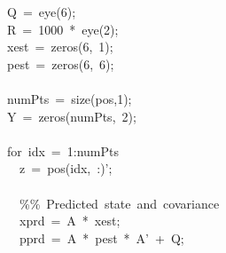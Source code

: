 \documentclass{article}\usepackage[]{graphicx}\usepackage[]{color}
\makeatletter
\newcommand{\hlnum}[1]{\textcolor[rgb]{0.863,0.196,0.184}{#1}}%
\newcommand{\hlstr}[1]{\textcolor[rgb]{0.863,0.196,0.184}{#1}}%
\newcommand{\hlopt}[1]{\textcolor[rgb]{0.576,0.631,0.631}{#1}}%
\newcommand{\hlstd}[1]{\textcolor[rgb]{0.514,0.58,0.588}{#1}}%
\newcommand{\hlkwa}[1]{\textcolor[rgb]{0.796,0.294,0.086}{#1}}%
\newenvironment{kframe}{%
 \def\at@end@of@kframe{}%
 \ifinner\ifhmode%
  \def\at@end@of@kframe{\end{minipage}}%
  \begin{minipage}{\columnwidth}%
 \fi\fi%
 \def\FrameCommand##1{\hskip\@totalleftmargin \hskip-\fboxsep
 \colorbox{shadecolor}{##1}\hskip-\fboxsep
     \hskip-\linewidth \hskip-\@totalleftmargin \hskip\columnwidth}%
 \MakeFramed {\advance\hsize-\width
   \@totalleftmargin\z@ \linewidth\hsize
   \@setminipage}}%
 {\par\unskip\endMakeFramed%
 \at@end@of@kframe}
\newenvironment{knitrout}{}{} %
\makeatother
\begin{document}
\begin{knitrout}
\begin{kframe}
\hlstd{}\hlstd{\ \ }\hlstd{Q\ }\hlopt{=\ }\hlstd{eye}\hlopt{(}\hlstd{}\hlnum{6}\hlstd{}\hlopt{);}\hspace*{\fill}\\
\hlstd{}\hlstd{\ \ }\hlstd{R\ }\hlopt{=\ }\hlstd{}\hlnum{1000\ }\hlstd{}\hlopt{{*}\ }\hlstd{eye}\hlopt{(}\hlstd{}\hlnum{2}\hlstd{}\hlopt{);}\hspace*{\fill}\\
\hlstd{}\hlstd{\ \ }\hlstd{x\textunderscore est\ }\hlopt{=\ }\hlstd{zeros}\hlopt{(}\hlstd{}\hlnum{6}\hlstd{}\hlopt{,\ }\hlstd{}\hlnum{1}\hlstd{}\hlopt{);}\hspace*{\fill}\\
\hlstd{}\hlstd{\ \ }\hlstd{p\textunderscore est\ }\hlopt{=\ }\hlstd{zeros}\hlopt{(}\hlstd{}\hlnum{6}\hlstd{}\hlopt{,\ }\hlstd{}\hlnum{6}\hlstd{}\hlopt{);}\hspace*{\fill}\\
\hlstd{}\hspace*{\fill}\\
\hlstd{}\hlstd{\ \ }\hlstd{numPts\ }\hlopt{=\ }\hlstd{}\hlkwa{size}\hlstd{}\hlopt{(}\hlstd{pos}\hlopt{,}\hlstd{}\hlnum{1}\hlstd{}\hlopt{);}\hspace*{\fill}\\
\hlstd{}\hlstd{\ \ }\hlstd{Y\ }\hlopt{=\ }\hlstd{zeros}\hlopt{(}\hlstd{numPts}\hlopt{,\ }\hlstd{}\hlnum{2}\hlstd{}\hlopt{);}\hspace*{\fill}\\
\hlstd{}\hspace*{\fill}\\
\hlstd{}\hlstd{\ \ }\hlstd{}\hlkwa{for\ }\hlstd{idx\ }\hlopt{=\ }\hlstd{}\hlnum{1}\hlstd{}\hlopt{:}\hlstd{numPts}\hspace*{\fill}\\
\hlstd{}\hlstd{\ \ \ \ }\hlstd{z\ }\hlopt{=\ }\hlstd{pos}\hlopt{(}\hlstd{idx}\hlopt{,\ :)}\hlstd{}\hlstr{';}\hspace*{\fill}\\
\hlstr{}\hspace*{\fill}\\
\hlstr{}\hlstd{\ \ \ \ }\hlstr{\%\%\ Predicted\ state\ and\ covariance}\hspace*{\fill}\\
\hlstr{}\hlstd{\ \ \ \ }\hlstr{x\textunderscore prd\ =\ A\ {*}\ x\textunderscore est;}\hspace*{\fill}\\
\hlstr{}\hlstd{\ \ \ \ }\hlstr{p\textunderscore prd\ =\ A\ {*}\ p\textunderscore est\ {*}\ A'}\hlstd{\ }\hlopt{+\ }\hlstd{Q}\hlopt{;}\hspace*{\fill}\\

\end{kframe}
\end{knitrout}
\end{document}
